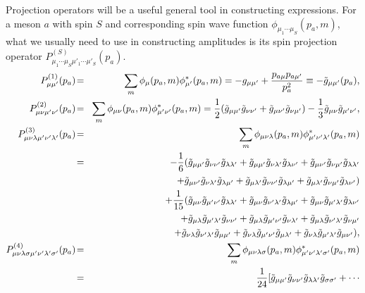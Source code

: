 Projection operators will be a useful general tool in constructing
expressions. For a meson $a$ with spin $S$ and corresponding spin
wave function $\phi_{\mu_1\cdots\mu_S}(p_a,m)$, what we usually
need to use in constructing amplitudes is its spin projection
operator $P^{(S)}_{\mu_1\cdots\mu_S\mu'_1\cdots\mu'_S}(p_a)$.
\begin{eqnarray}
P^{(1)}_{\mu\mu'}(p_a) \!&=&\!
\sum_m\phi_\mu(p_a,m)\phi^*_{\mu'}(p_a,m)=-g_{\mu\mu'}+{p_{a\mu}p_{a\mu'}\over
p_a^2}\equiv -\tilde g_{\mu\mu'}(p_a), \\
P^{(2)}_{\mu\nu\mu'\nu'}(p_a) \!&=&\!
\sum_m\phi_{\mu\nu}(p_a,m)\phi^*_{\mu'\nu'}(p_a,m)={1\over 2}
(\tilde g_{\mu\mu'}\tilde g_{\nu\nu'}+\tilde g_{\mu\nu'}\tilde
g_{\nu\mu'})-{1\over 3}\tilde g_{\mu\nu}\tilde g_{\mu'\nu'}, \\
P^{(3)}_{\mu\nu\lambda\mu'\nu'\lambda'}(p_a) \!&=&\!
\sum_m\phi_{\mu\nu\lambda}(p_a,m)\phi^*_{\mu'\nu'\lambda'}(p_a,m)\nonumber\\
&=&\! -{1\over 6} (\tilde g_{\mu\mu'}\tilde g_{\nu\nu'}\tilde
g_{\lambda\lambda'}+\tilde g_{\mu\mu'}\tilde g_{\nu\lambda'}\tilde
g_{\lambda\nu'}+\tilde g_{\mu\nu'}\tilde g_{\nu\mu'}\tilde
g_{\lambda\lambda'} \nonumber\\
& & \quad\quad +\tilde g_{\mu\nu'}\tilde g_{\nu\lambda'}\tilde
g_{\lambda\mu'}+\tilde g_{\mu\lambda'}\tilde g_{\nu\nu'}\tilde
g_{\lambda\mu'}+\tilde g_{\mu\lambda'}\tilde g_{\nu\mu'}\tilde
g_{\lambda\nu'})\nonumber\\
& &\! +{1\over 15}(\tilde g_{\mu\nu}\tilde g_{\mu'\nu'}\tilde
g_{\lambda\lambda'}+\tilde g_{\mu\nu}\tilde g_{\nu'\lambda'}\tilde
g_{\lambda\mu'}+\tilde g_{\mu\nu}\tilde g_{\mu'\lambda'}\tilde
g_{\lambda\nu'}\nonumber\\
& & \quad\quad +\tilde g_{\mu\lambda}\tilde g_{\mu'\lambda'}\tilde
g_{\nu\nu'}+\tilde g_{\mu\lambda}\tilde g_{\mu'\nu'}\tilde
g_{\nu\lambda'}+\tilde g_{\mu\lambda}\tilde g_{\nu'\lambda'}\tilde
g_{\nu\mu'}\nonumber\\
& & \quad\quad +\tilde g_{\nu\lambda}\tilde g_{\nu'\lambda'}\tilde
g_{\mu\mu'}+\tilde g_{\nu\lambda}\tilde g_{\mu'\nu'}\tilde
g_{\mu\lambda'}+\tilde g_{\nu\lambda}\tilde g_{\mu'\lambda'}\tilde
g_{\mu\nu'}), \\
P^{(4)}_{\mu\nu\lambda\sigma\mu'\nu'\lambda'\sigma'}(p_a) \!&=&\!
\sum_m\phi_{\mu\nu\lambda\sigma}(p_a,m)\phi^*_{\mu'\nu'\lambda'\sigma'}(p_a,m)
\nonumber\\
&=&\! {1\over 24} [\tilde g_{\mu\mu'}\tilde g_{\nu\nu'}\tilde
g_{\lambda\lambda'}\tilde g_{\sigma\sigma'} +\cdots

\end{eqnarray}
